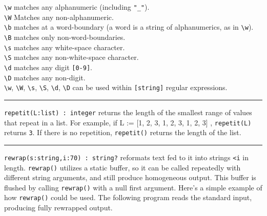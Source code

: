 \texttt{{\textbackslash}w} matches any alphanumeric (including
\texttt{"\_"}).\\
\texttt{{\textbackslash}W} Matches any non-alphanumeric.\\
\texttt{{\textbackslash}b} matches at a word-boundary (a word is
a string of alphanumerics, as in \texttt{{\textbackslash}w}).\\
\texttt{{\textbackslash}B} matches only non-word-boundaries.\\
\texttt{{\textbackslash}s} matches any white-space character.\\
\texttt{{\textbackslash}S} matches any non-white-space
character.\\
\texttt{{\textbackslash}d} matches any digit \texttt{[0-9]}.\\
\texttt{{\textbackslash}D} matches any non-digit.\\
\texttt{{\textbackslash}w}, \texttt{{\textbackslash}W},
\texttt{{\textbackslash}s}, \texttt{{\textbackslash}S},
\texttt{{\textbackslash}d}, \texttt{{\textbackslash}D} can be used
within \texttt{[string]} regular expressions.

\vspace{0.25cm}\hrule{}

\texttt{repetit(L:list) : integer} returns the length of the smallest
range of values that repeat in a list. For example, if L := [1, 2, 3,
1, 2, 3, 1, 2, 3] , \texttt{repetit(L)} returns \texttt{3}. If there is
no repetition, \texttt{repetit()} returns the length of the list. 

\vspace{0.25cm}\hrule{}

\texttt{rewrap(s:string,i:70) : string?} reformats text fed to it into
strings \texttt{{\textless}i} in length. \texttt{rewrap()} utilizes a
static buffer, so it can be called repeatedly with different string
arguments, and still produce homogeneous output. This buffer is flushed
by calling \texttt{rewrap()} with a null first argument.
Here's a simple example of how \texttt{rewrap()} could
be used. The following program reads the standard input, producing
fully rewrapped output.


